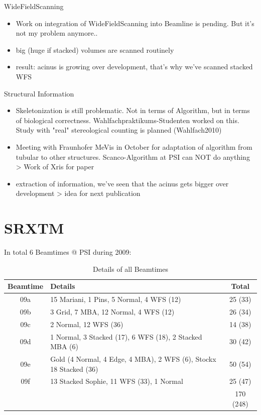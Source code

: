 \documentclass[a4paper,twoside,english,DIV=calc]{scrartcl}
\begin{document}
WideFieldScanning
\begin{itemize}
\item Work on integration of WideFieldScanning into Beamline is pending. But it's not my problem anymore..
\item big (huge if stacked) volumes are scanned routinely
\item result: acinus is growing over development, that's why we've scanned stacked WFS
\end{itemize}

Structural Information
\begin{itemize}
\item Skeletonization is still problematic. Not in terms of Algorithm, but in terms of biological correctness. Wahlfachpraktikums-Studenten worked on this. Study with "real" stereological counting is planned (Wahlfach2010)
\item Meeting with Fraunhofer MeVis in October for adaptation of algorithm from tubular to other structures. Scanco-Algorithm at PSI can NOT do anything > Work of Xris for paper
\item extraction of information, we've seen that the acinus gets bigger over development > idea for next publication
\end{itemize}

\section{SRXTM}\label{sec:srxtm}
In total 6 Beamtimes @ PSI during 2009:
\begin{table}[htp]
\centering
\scriptsize
\begin{tabular}{clc}
\toprule
Beamtime & Details & Total\\
\midrule
09a & 15 Mariani, 1 Pins, 5 Normal, 4 WFS (12) & 25 (33)\\
09b & 3 Grid, 7 MBA, 12 Normal, 4 WFS (12) & 26 (34)\\
09c & 2 Normal, 12 WFS (36) & 14 (38)\\
09d & 1 Normal, 3 Stacked (17), 6 WFS (18), 2 Stacked MBA (6) & 30 (42)\\
09e & Gold (4 Normal, 4 Edge, 4 MBA), 2 WFS (6), Stockx 18 Stacked (36) & 50 (54)\\
09f & 13 Stacked Sophie, 11 WFS (33), 1 Normal & 25 (47)\\
\cmidrule(lr){3-3}
& & 170 (248)\\
\bottomrule
\end{tabular}
\normalsize
\caption{Details of all Beamtimes}
\label{tab:srxtm}
\end{table}
\end{document}
